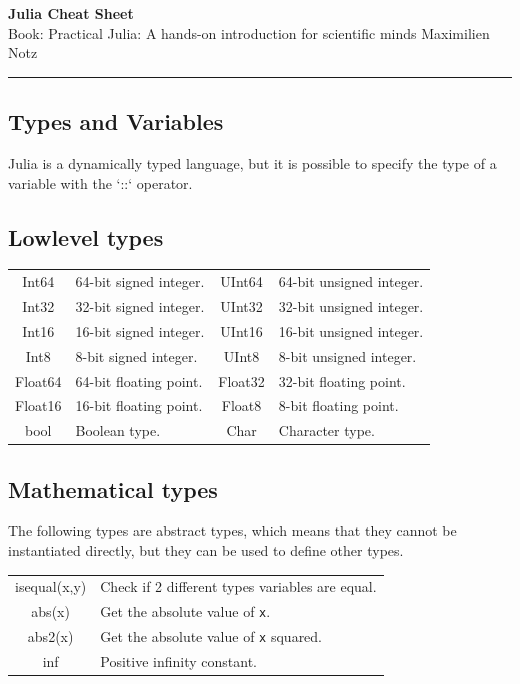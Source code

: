 \documentclass[5pt]{article}
\begin{document}
\begin{center}
     \Large{\textbf{Julia Cheat Sheet}}\\
     \small{Book: Practical Julia: A hands-on introduction for scientific minds }\hfill\small{\textcopyright Maximilien Notz \the\year{}}
     \noindent\rule{20cm}{0.4pt}
\end{center}
\begin{multicols}{2}
\setcounter{secnumdepth}{0}


\section{Types and Variables}
Julia is a dynamically typed language, but it is possible to specify the type of a variable with the `::` operator.

\subsection{Lowlevel types}
\begin{tabular}{C L C L}
Int64 & 64-bit signed integer. & UInt64 & 64-bit unsigned integer.\\
Int32 & 32-bit signed integer. & UInt32 & 32-bit unsigned integer.\\
Int16 & 16-bit signed integer. & UInt16 & 16-bit unsigned integer.\\
Int8  & 8-bit signed integer. & UInt8  & 8-bit unsigned integer.\\
Float64 & 64-bit floating point. & Float32 & 32-bit floating point.\\
Float16 & 16-bit floating point. & Float8 & 8-bit floating point.\\
bool & Boolean type. & Char & Character type.\\
\end{tabular}

\subsection{Mathematical types}
The following types are abstract types, which means that they cannot be instantiated directly, but they can be used to define other types.
\begin{tabular}{C L}
    isequal(x,y) & Check if 2 different types variables are equal.\\
    abs(x) & Get the absolute value of \texttt{x}.\\
    abs2(x) & Get the absolute value of \texttt{x} squared.\\
    inf & Positive infinity constant.\\
\end{tabular}


\end{multicols}
\end{document}
